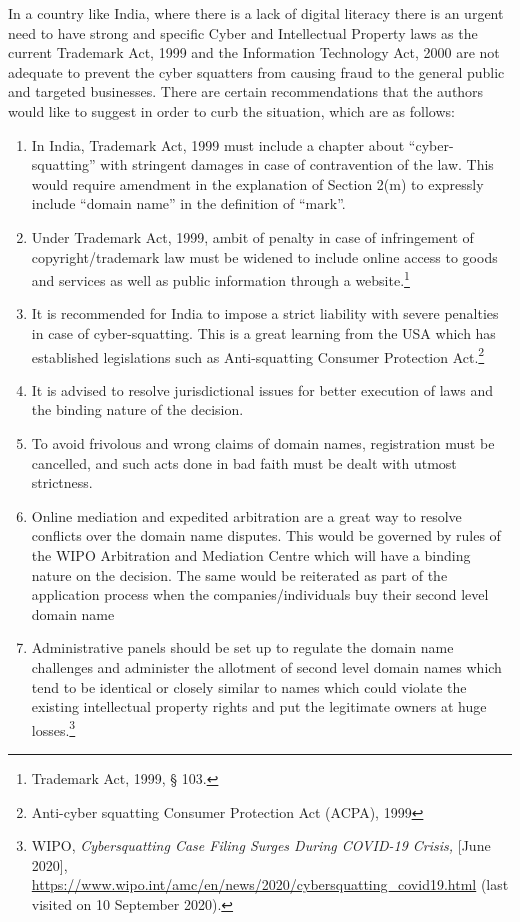 \begin{multicols}{2}
\noi
In a country like India, where there is a lack of digital literacy there is an urgent need to have
strong and specific Cyber and Intellectual Property laws as the current Trademark Act, 1999
and the Information Technology Act, 2000 are not adequate to prevent the cyber squatters
from causing fraud to the general public and targeted businesses. There are certain
recommendations that the authors would like to suggest in order to curb the situation, which
are as follows:

\begin{enumerate}[label=$\bullet$]
\item In India, Trademark Act, 1999 must include a chapter about “cyber-squatting” with
stringent damages in case of contravention of the law. This would require amendment
in the explanation of Section 2(m) to expressly include “domain name” in the
definition of “mark”.

\item Under Trademark Act, 1999, ambit of penalty in case of infringement of
copyright/trademark law must be widened to include online access to goods and
services as well as public information through a website.\footnote{Trademark Act, 1999, § 103.}

\item It is recommended for India to impose a strict liability with severe penalties in case of
cyber-squatting. This is a great learning from the USA which has established
legislations such as Anti-squatting Consumer Protection Act.\footnote{Anti-cyber squatting Consumer Protection Act (ACPA), 1999}

\item It is advised to resolve jurisdictional issues for better execution of laws and the
binding nature of the decision.

\item To avoid frivolous and wrong claims of domain names, registration must be
cancelled, and such acts done in bad faith must be dealt with utmost strictness.

\item Online mediation and expedited arbitration are a great way to resolve conflicts over
the domain name disputes. This would be governed by rules of the WIPO Arbitration
and Mediation Centre which will have a binding nature on the decision. The same
would be reiterated as part of the application process when the companies/individuals
buy their second level domain name

\item Administrative panels should be set up to regulate the domain name challenges and
administer the allotment of second level domain names which tend to be identical or
closely similar to names which could violate the existing intellectual property rights
and put the legitimate owners at huge losses.\footnote{WIPO, \textit{Cybersquatting Case Filing Surges During COVID-19 Crisis,} [June 2020], \url{https://www.wipo.int/amc/en/news/2020/cybersquatting_covid19.html} (last visited on 10 September 2020).}


\end{enumerate}
\end{multicols}

